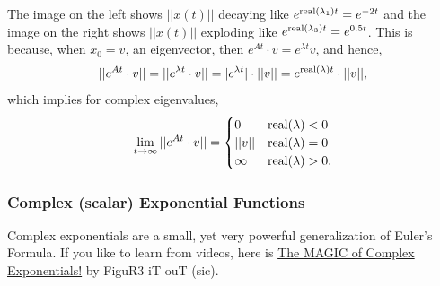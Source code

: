 The image on the left shows $||x(t)||$ decaying like $e^{{\rm real}(\lambda_1) t}=e^{-2t}$ and the image on the right shows $||x(t)||$ exploding like $e^{{\rm real}(\lambda_3) t} = e^{0.5t}$. This is because, when $x_0=v$, an eigenvector, then $e^{At} \cdot v = e^{\lambda t} v$, and hence, 
$$||e^{A t} \cdot v|| = ||e^{\lambda t} \cdot v|| = |e^{\lambda t}| \cdot ||v|| = e^{{\rm real}(\lambda) t} \cdot||v||,$$
which implies for complex eigenvalues, 
$$ \lim_{t \to \infty} ||e^{A t} \cdot v|| = \begin{cases}
    0 & {\rm real}(\lambda) < 0\\
    ||v|| & {\rm real}(\lambda)= 0\\
    \infty & {\rm real}(\lambda) >0.
\end{cases}$$

\bigskip

\begin{center}
\setlength{\fboxrule}{2pt}  %
\end{center}

\subsubsection{Complex (scalar) Exponential Functions}


Complex exponentials are a small, yet very powerful generalization of Euler's Formula. If you like to learn from videos, here is \href{https://youtu.be/bDK-gW_P28o}{The MAGIC of Complex Exponentials!} by FiguR3 iT ouT (sic).

